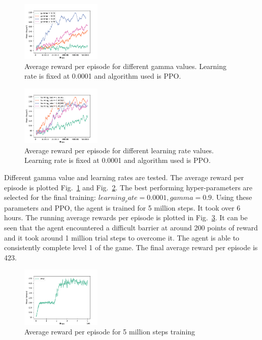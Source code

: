 \documentclass[conference]{IEEEtran}
\begin{document}
\begin{figure}
    \centering
    \includegraphics[width=0.34\textwidth]{compare_gamma.png}
    \caption{Average reward per episode for different gamma values. Learning rate is fixed at 0.0001 and algorithm used is PPO.}
    \label{fig:compare_gamma}
\end{figure}

\begin{figure}
    \centering
    \includegraphics[width=0.34\textwidth]{compare_learning_rate.png}
    \caption{Average reward per episode for different learning rate values. Learning rate is fixed at 0.0001 and algorithm used is PPO.}
    \label{fig:compare_learning_rate}
\end{figure}

Different gamma value and learning rates are tested. The average reward per episode is plotted Fig.~\ref{fig:compare_gamma} and Fig.~\ref{fig:compare_learning_rate}. The best performing hyper-parameters are selected for the final training: \(learning_rate = 0.0001, gamma=0.9\). Using these parameters and PPO, the agent is trained for 5 million steps. It took over 6 hours. The running average rewards per episode is plotted in Fig.~\ref{fig:final_training}. It can be seen that the agent encountered a difficult barrier at around 200 points of reward and it took around 1 million trial steps to overcome it. The agent is able to consistently complete level 1 of the game. The final average reward per episode is 423.

\begin{figure}
    \centering
    \includegraphics[width=0.34\textwidth]{final_training.png}
    \caption{Average reward per episode for 5 million steps training}
    \label{fig:final_training}
\end{figure}
\end{document}
